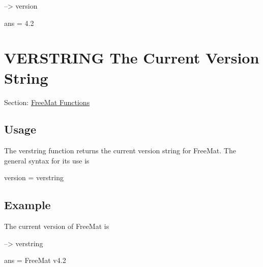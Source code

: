 \begin{DoxyVerbInclude}
--> version

ans = 
4.2
\end{DoxyVerbInclude}
 \hypertarget{freemat_verstring}{}\section{V\-E\-R\-S\-T\-R\-I\-N\-G The Current Version String}\label{freemat_verstring}
Section\-: \hyperlink{sec_freemat}{Free\-Mat Functions} \hypertarget{vtkwidgets_vtkxyplotwidget_Usage}{}\subsection{Usage}\label{vtkwidgets_vtkxyplotwidget_Usage}
The {\ttfamily verstring} function returns the current version string for Free\-Mat. The general syntax for its use is \begin{DoxyVerb}    version = verstring
\end{DoxyVerb}
 \hypertarget{variables_struct_Example}{}\subsection{Example}\label{variables_struct_Example}
The current version of Free\-Mat is


\begin{DoxyVerbInclude}
--> verstring

ans = 
FreeMat v4.2
\end{DoxyVerbInclude}
 